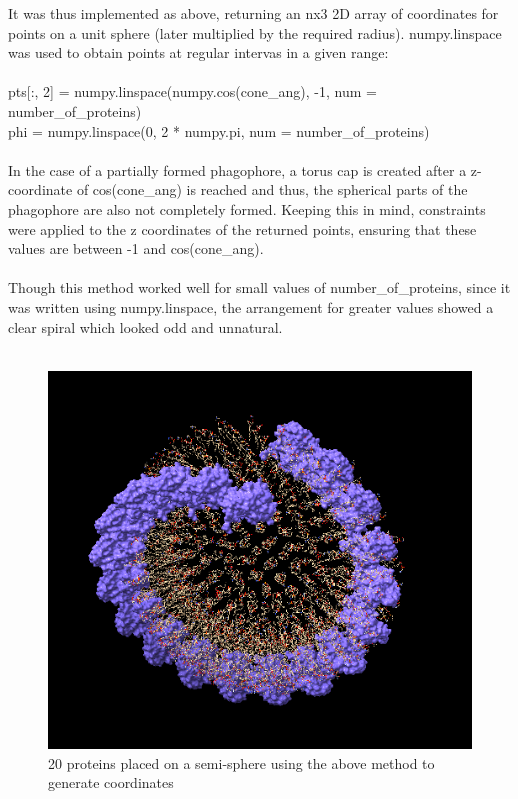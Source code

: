 \documentclass[12pt, a4paper]{report}
\begin{document}
It was thus implemented as above, returning an nx3 2D array of coordinates for points on a unit sphere (later multiplied by the required radius). numpy.linspace was used to obtain points at regular intervas in a given range: 
\\~\\ 
pts[:, 2] = numpy.linspace(numpy.cos(cone\_ang), -1, num = number\_of\_proteins) 
\\ 
phi = numpy.linspace(0, 2 * numpy.pi, num = number\_of\_proteins) 
\\~\\ 

In the case of a partially formed phagophore, a torus cap is created after a z-coordinate of cos(cone\_ang) is reached and thus, the spherical parts of the phagophore are also not completely formed. Keeping this in mind, constraints were applied to the z coordinates of the returned points, ensuring that these values are between -1 and cos(cone\_ang). 
\\~\\ 

Though this method worked well for small values of number\_of\_proteins, since it was written using numpy.linspace, the arrangement for greater values showed a clear spiral which looked odd and unnatural. 
\\~\\ 
\begin{figure}[h]
    \includegraphics[scale=1]{images/first impl 20.png} 
    \centering 
    \caption{20 proteins placed on a semi-sphere using the above method to generate coordinates}
    \centering
\end{figure} 
\end{document}
